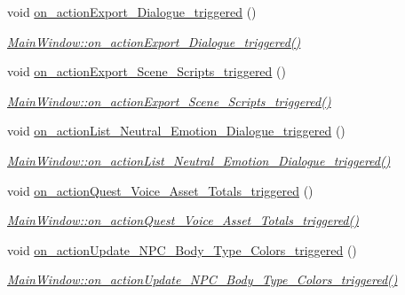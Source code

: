 \begin{DoxyCompactItemize}
void \hyperlink{class_main_window_a60afb0fb3babf373c67896540945f466}{on\+\_\+action\+Export\+\_\+\+Dialogue\+\_\+triggered} ()
\begin{DoxyCompactList}\small\item\em \hyperlink{class_main_window_a60afb0fb3babf373c67896540945f466}{Main\+Window\+::on\+\_\+action\+Export\+\_\+\+Dialogue\+\_\+triggered()} \end{DoxyCompactList}\item 
void \hyperlink{class_main_window_ad0ea1db59606c556eff984ea8aaad198}{on\+\_\+action\+Export\+\_\+\+Scene\+\_\+\+Scripts\+\_\+triggered} ()
\begin{DoxyCompactList}\small\item\em \hyperlink{class_main_window_ad0ea1db59606c556eff984ea8aaad198}{Main\+Window\+::on\+\_\+action\+Export\+\_\+\+Scene\+\_\+\+Scripts\+\_\+triggered()} \end{DoxyCompactList}\item 
void \hyperlink{class_main_window_accb4e259115557925cc14c1ca6908812}{on\+\_\+action\+List\+\_\+\+Neutral\+\_\+\+Emotion\+\_\+\+Dialogue\+\_\+triggered} ()
\begin{DoxyCompactList}\small\item\em \hyperlink{class_main_window_accb4e259115557925cc14c1ca6908812}{Main\+Window\+::on\+\_\+action\+List\+\_\+\+Neutral\+\_\+\+Emotion\+\_\+\+Dialogue\+\_\+triggered()} \end{DoxyCompactList}\item 
void \hyperlink{class_main_window_a008331d7419ef18e54e25172b94e05c0}{on\+\_\+action\+Quest\+\_\+\+Voice\+\_\+\+Asset\+\_\+\+Totals\+\_\+triggered} ()
\begin{DoxyCompactList}\small\item\em \hyperlink{class_main_window_a008331d7419ef18e54e25172b94e05c0}{Main\+Window\+::on\+\_\+action\+Quest\+\_\+\+Voice\+\_\+\+Asset\+\_\+\+Totals\+\_\+triggered()} \end{DoxyCompactList}\item 
void \hyperlink{class_main_window_a9519746e9ca51688b9e8ba99e418739e}{on\+\_\+action\+Update\+\_\+\+N\+P\+C\+\_\+\+Body\+\_\+\+Type\+\_\+\+Colors\+\_\+triggered} ()
\begin{DoxyCompactList}\small\item\em \hyperlink{class_main_window_a9519746e9ca51688b9e8ba99e418739e}{Main\+Window\+::on\+\_\+action\+Update\+\_\+\+N\+P\+C\+\_\+\+Body\+\_\+\+Type\+\_\+\+Colors\+\_\+triggered()} \end{DoxyCompactList}\item 

\end{DoxyCompactItemize}

